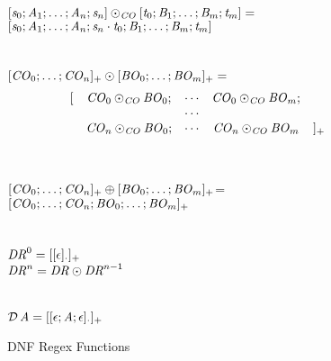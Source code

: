 \begin{figure}
\ConcatConjunct{} \OfType{} \ArrowTypeOf{\ConjunctType{}}{\ArrowTypeOf{\ConjunctType{}}{\ConjunctType{}}}\\
$[\mathit{s}_0;\mathit{A}_1;\ldots;\mathit{A}_n;\mathit{s}_n]\odot_{\mathit{CO}}[\mathit{t}_0;\mathit{B}_1;\ldots;\mathit{B}_m;\mathit{t}_m]=$\\
\hspace*{2ex}$[\mathit{s}_0;\mathit{A}_1;\ldots;\mathit{A}_n;\mathit{s}_n\cdot\mathit{t}_0;\mathit{B}_1;\ldots;\mathit{B}_m;\mathit{t}_m]$\\
\\
\ConcatDNF{} \OfType{} \ArrowTypeOf{\DNFRegexType{}}{\ArrowTypeOf{\DNFRegexType{}}{\DNFRegexType{}}}\\
$[\mathit{CO}_0;\ldots;\mathit{CO}_n]_{+}\odot[\mathit{BO}_0;\ldots;\mathit{BO}_m]_{+}=$
\[
\begin{array}{rcccl}
[ & \mathit{CO}_0\odot_{\mathit{CO}}\mathit{BO}_0; & \cdots & \mathit{CO}_0\odot_{\mathit{CO}}\mathit{BO}_m; \\
& & \cdots & \\
& \mathit{CO}_n\odot_{\mathit{CO}}\mathit{BO}_0; & \cdots & \mathit{CO}_n\odot_{\mathit{CO}}\mathit{BO}_m & ]_{+}
\end{array}
\]
\\
\OrDNF{} \OfType{} \ArrowTypeOf{\DNFRegexType{}}{\DNFRegexType{}}\\
$[\mathit{CO}_0;\ldots;\mathit{CO}_n]_{+}\oplus[\mathit{BO}_0;\ldots;\mathit{BO}_m]_{+}$=\\
\hspace*{2ex}$[\mathit{CO}_0;\ldots;\mathit{CO}_n;\mathit{BO}_0;\ldots;\mathit{BO}_m]_{+}$\\
\\
 \OfType{} \ArrowTypeOf{\DNFRegexType{}}{\DNFRegexType{}}\\
$\mathit{DR}^{0}=[[\epsilon]_{\cdot}]_{+}$\\
$\mathit{DR}^{n}=\mathit{DR}\odot\mathit{DR}^{n-1}$\\
\\
\AtomToDNFRegex{} \OfType{} \ArrowTypeOf{\AtomType{}}{\DNFRegexType{}}\\
$\mathcal{D}\, \mathit{A}=[[\epsilon;\mathit{A};\epsilon]_{\cdot}]_{+}$
\caption{DNF Regex Functions}
\label{fig:dnf-regex-functions}
\end{figure}
